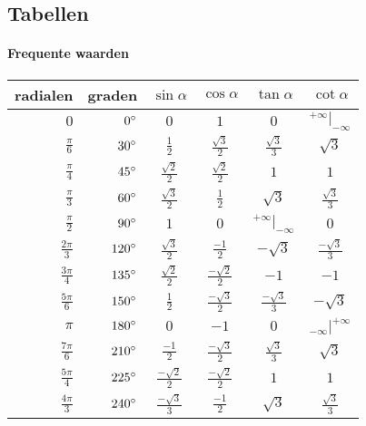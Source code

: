 
 \subsection{Tabellen}
 \label{sec:tabel}
  
\paragraph{Frequente waarden}
\label{sec:FrequenteWaarden}

   \begin{center}
	  \begin{tabular}{|r|r||c|c|c|c|}
	    \hline
	    radialen & graden & $\sin \alpha$ & $\cos \alpha$ & $\tan \alpha$ & $\cot \alpha$ \\
	    \hline \hline
	    $0$ & $0^\circ$ & $0$ & $1$ & $0$ & $^{+\infty} | _{-\infty}$ \\ 
	    \hline
	    $\frac{\pi}{6}$ & $30^\circ$ & $\frac{1}{2}$ & $\frac{\sqrt{3}}{2}$ & $\frac{\sqrt{3}}{3}$ & $\sqrt{3}$ \\
	    \hline
	    $\frac{\pi}{4}$ & $45^\circ$ & $\frac{\sqrt{2}}{2}$ & $\frac{\sqrt{2}}{2}$ & $1$ & $1$ \\
	    \hline
	    $\frac{\pi}{3}$ & $60^\circ$ & $\frac{\sqrt{3}}{2}$ & $\frac{1}{2}$ & $\sqrt{3}$ & $\frac{\sqrt{3}}{3}$ \\
	    \hline
	    $\frac{\pi}{2}$ & $90^\circ$ & $1$ & $0$ & $^{+\infty} | _{-\infty}$ & $0$ \\
	    \hline
	    $\frac{2\pi}{3}$ & $120^\circ$ & $\frac{\sqrt{3}}{2}$ & $\frac{-1}{2}$ & $-\sqrt{3}$ & $\frac{-\sqrt{3}}{3}$ \\
	    \hline
	    $\frac{3\pi}{4}$ & $135^\circ$ & $\frac{\sqrt{2}}{2}$ & $\frac{-\sqrt{2}}{2}$ & $-1$ & $-1$ \\
	    \hline
	    $\frac{5\pi}{6}$ & $150^\circ$ & $\frac{1}{2}$ & $\frac{-\sqrt{3}}{2}$ & $\frac{-\sqrt{3}}{3}$ & $-\sqrt{3}$ \\
	    \hline
	    $\pi$ & $180^\circ$ & $0$ & $-1$ & $0$ & $_{-\infty} | ^{+\infty}$ \\
	    \hline  
	    $\frac{7\pi}{6}$ & $210^\circ$ & $\frac{-1}{2}$ & $\frac{-\sqrt{3}}{2}$ & $\frac{\sqrt{3}}{3}$ & $\sqrt{3}$ \\
	    \hline
	    $\frac{5\pi}{4}$ & $225^\circ$ & $\frac{-\sqrt{2}}{2}$ & $\frac{-\sqrt{2}}{2}$ & $1$ & $1$ \\
	    \hline
	    $\frac{4\pi}{3}$ & $240^\circ$ & $\frac{-\sqrt{3}}{3}$ & $\frac{-1}{2}$ & $\sqrt{3}$ & $\frac{\sqrt{3}}{3}$ \\

\end{tabular}
\end{center}
